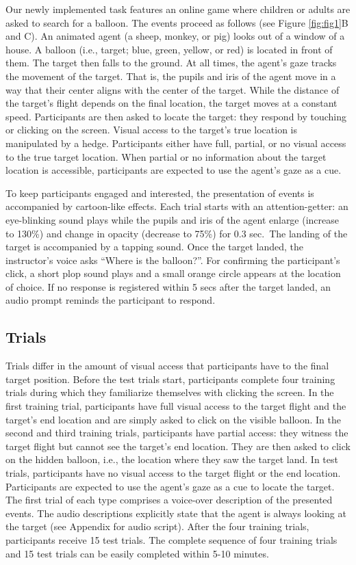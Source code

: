 \documentclass[
  man,floatsintext]{apa6}
\begin{document}
Our newly implemented task features an online game where children or adults are asked to search for a balloon. The events proceed as follows (see Figure \ref{fig:fig1}B and C). An animated agent (a sheep, monkey, or pig) looks out of a window of a house. A balloon (i.e., target; blue, green, yellow, or red) is located in front of them. The target then falls to the ground. At all times, the agent's gaze tracks the movement of the target. That is, the pupils and iris of the agent move in a way that their center aligns with the center of the target. While the distance of the target's flight depends on the final location, the target moves at a constant speed. Participants are then asked to locate the target: they respond by touching or clicking on the screen. Visual access to the target's true location is manipulated by a hedge. Participants either have full, partial, or no visual access to the true target location. When partial or no information about the target location is accessible, participants are expected to use the agent's gaze as a cue.

To keep participants engaged and interested, the presentation of events is accompanied by cartoon-like effects. Each trial starts with an attention-getter: an eye-blinking sound plays while the pupils and iris of the agent enlarge (increase to 130\%) and change in opacity (decrease to 75\%) for 0.3 sec.~The landing of the target is accompanied by a tapping sound. Once the target landed, the instructor's voice asks ``Where is the balloon?''. For confirming the participant's click, a short plop sound plays and a small orange circle appears at the location of choice. If no response is registered within 5 secs after the target landed, an audio prompt reminds the participant to respond.

\hypertarget{trials}{%
\subsection{Trials}\label{trials}}

Trials differ in the amount of visual access that participants have to the final target position. Before the test trials start, participants complete four training trials during which they familiarize themselves with clicking the screen. In the first training trial, participants have full visual access to the target flight and the target's end location and are simply asked to click on the visible balloon. In the second and third training trials, participants have partial access: they witness the target flight but cannot see the target's end location. They are then asked to click on the hidden balloon, i.e., the location where they saw the target land. In test trials, participants have no visual access to the target flight or the end location. Participants are expected to use the agent's gaze as a cue to locate the target. The first trial of each type comprises a voice-over description of the presented events. The audio descriptions explicitly state that the agent is always looking at the target (see Appendix for audio script). After the four training trials, participants receive 15 test trials. The complete sequence of four training trials and 15 test trials can be easily completed within 5-10 minutes.
\end{document}
